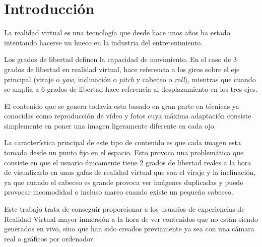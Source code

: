 
\pagestyle{empty}
\chapter{Introducción}
La realidad virtual es una tecnología que desde hace unos años ha estado intentando hacerse un hueco en la industria del entretenimiento.




Los grados de libertad definen la capacidad de movimiento. En el caso de 3 grados de libertad en realidad virtual, hace referencia a los giros sobre el eje principal (viraje o \textit{yaw}, inclinación o \textit{pitch} y cabeceo o \textit{roll}), mientras que cuando se amplia a 6 grados de libertad hace referencia al desplazamiento en los tres ejes.

El contenido que se genera todavía esta basado en gran parte en técnicas ya conocidas como reproducción de vídeo y fotos cuya máxima adaptación consiste simplemente en poner una imagen ligeramente diferente en cada ojo.

La característica principal de este tipo de contenido es que cada imagen esta tomada desde un punto fijo en el espacio. Esto provoca una problemática que consiste en que el usuario únicamente tiene 2 grados de libertad reales a la hora de visualizarlo en unas gafas de realidad virtual que son el viraje y la inclinación, ya que cuando el cabeceo es grande provoca ver imágenes duplicadas y puede provocar incomodidad o incluso mareo cuando existe un pequeño cabeceo.

Este trabajo trata de conseguir proporcionar a los usuarios de experiencias de Realidad Virtual mayor inmersión a la hora de ver contenidos que no están siendo generados en vivo, sino que han sido creados previamente ya sea con una cámara real o gráficos por ordenador.


